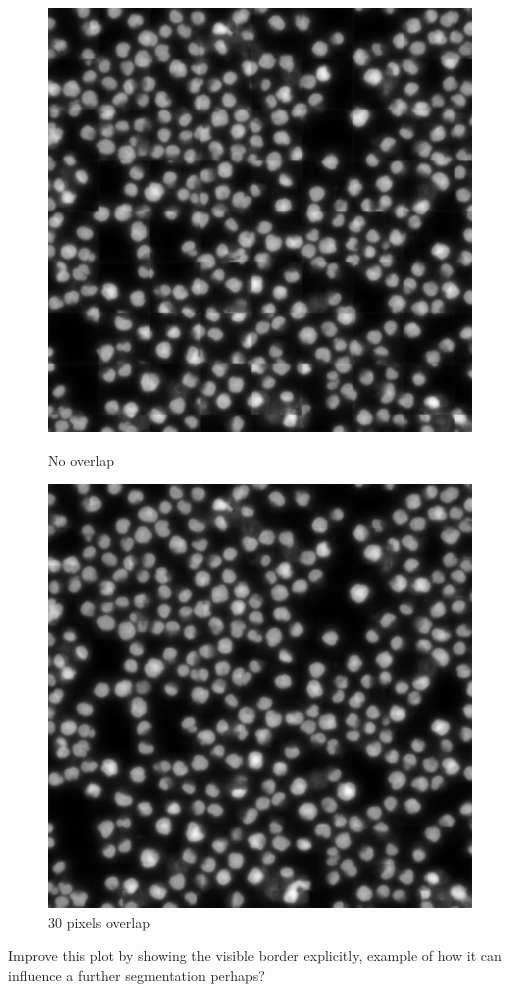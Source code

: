\begin{figure}[H]
    \centering
    \begin{minipage}{.48\textwidth}
      \centering
      \includegraphics[width=\linewidth]{bilder/crops_combination/prediction_border_0.png}
      \caption{No overlap}
      \label{fig:crops_combination_0}
    \end{minipage}%
    \vspace{1cm}
    \begin{minipage}{.48\textwidth}
      \centering
      \includegraphics[width=\linewidth]{bilder/crops_combination/prediction_border_34.png}
      \caption{30 pixels overlap}
      \label{fig:crops_combination_34}
    \end{minipage}
\end{figure}


Improve this plot by showing the visible border explicitly, example of how it can influence a further segmentation perhaps?